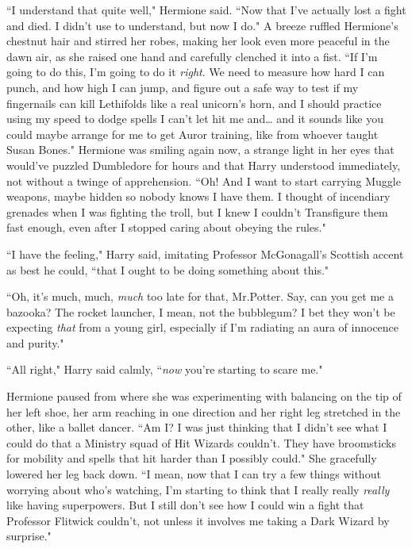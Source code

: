 ``I understand that quite well," Hermione said. ``Now that I've actually lost a fight and died. I didn't use to understand, but now I do." A breeze ruffled Hermione's chestnut hair and stirred her robes, making her look even more peaceful in the dawn air, as she raised one hand and carefully clenched it into a fist. ``If I'm going to do this, I'm going to do it \emph{right}. We need to measure how hard I can punch, and how high I can jump, and figure out a safe way to test if my fingernails can kill Lethifolds like a real unicorn's horn, and I should practice using my speed to dodge spells I can't let hit me and{\ldots} and it sounds like you could maybe arrange for me to get Auror training, like from whoever taught Susan Bones." Hermione was smiling again now, a strange light in her eyes that would've puzzled Dumbledore for hours and that Harry understood immediately, not without a twinge of apprehension. ``Oh! And I want to start carrying Muggle weapons, maybe hidden so nobody knows I have them. I thought of incendiary grenades when I was fighting the troll, but I knew I couldn't Transfigure them fast enough, even after I stopped caring about obeying the rules."

``I have the feeling," Harry said, imitating Professor McGonagall's Scottish accent as best he could, ``that I ought to be doing something about this."

``Oh, it's much, much, \emph{much} too late for that, Mr.\?Potter. Say, can you get me a bazooka? The rocket launcher, I mean, not the bubblegum? I bet they won't be expecting \emph{that} from a young girl, especially if I'm radiating an aura of innocence and purity."

``All right," Harry said calmly, ``\emph{now} you're starting to scare me."

Hermione paused from where she was experimenting with balancing on the tip of her left shoe, her arm reaching in one direction and her right leg stretched in the other, like a ballet dancer. ``Am I? I was just thinking that I didn't see what I could do that a Ministry squad of Hit Wizards couldn't. They have broomsticks for mobility and spells that hit harder than I possibly could." She gracefully lowered her leg back down. ``I mean, now that I can try a few things without worrying about who's watching, I'm starting to think that I really really \emph{really} like having superpowers. But I still don't see how I could win a fight that Professor Flitwick couldn't, not unless it involves me taking a Dark Wizard by surprise."

